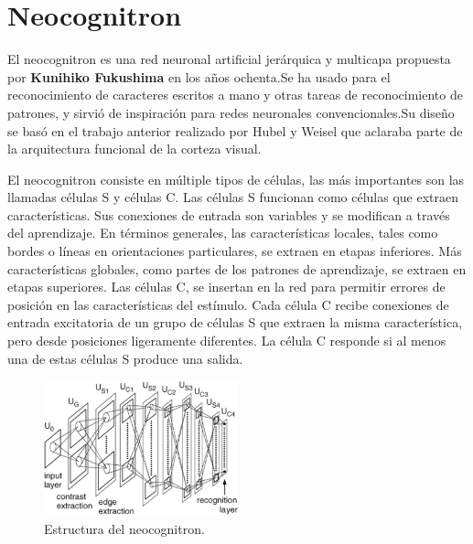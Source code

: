 \documentclass[a4paper, 11pt]{article} %
\begin{document}
\section{Neocognitron}
El neocognitron es una red neuronal artificial jerárquica y multicapa propuesta por \textbf{Kunihiko Fukushima} en los años ochenta.Se ha usado para el reconocimiento de caracteres escritos a mano y otras tareas de reconocimiento de patrones, y sirvió de inspiración para redes neuronales convencionales.Su diseño se basó en el trabajo anterior realizado por Hubel y Weisel que aclaraba parte de la arquitectura funcional de la corteza visual.

El neocognitron consiste en múltiple tipos de células, las más importantes son las llamadas células S y células C. Las células S funcionan como células que extraen características. Sus conexiones de entrada son variables y se modifican a través del aprendizaje. En términos generales, las características locales, tales como bordes o líneas en orientaciones particulares, se extraen en etapas inferiores. Más características globales, como partes de los patrones de aprendizaje, se extraen en etapas superiores.
Las células C, se insertan en la red para permitir errores de posición en las características del estímulo. Cada célula C recibe conexiones de entrada excitatoria de un grupo de células S que extraen la misma característica, pero desde posiciones ligeramente diferentes. La célula C responde si al menos una de estas células S produce una salida.

\begin{figure}[H]
	\centering
	\includegraphics[width=0.5\textwidth]{neocognitron1.png}
	\caption{Estructura del neocognitron.}
	\label{Estructura del neocognitron.}
\end{figure}
\end{document}

